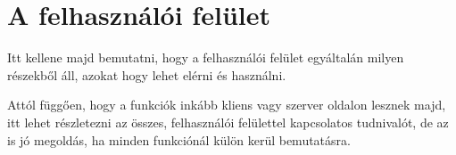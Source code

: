 \chapter{A felhasználói felület}

Itt kellene majd bemutatni, hogy a felhasználói felület egyáltalán milyen részekből áll, azokat hogy lehet elérni és használni.

Attól függően, hogy a funkciók inkább kliens vagy szerver oldalon lesznek majd, itt lehet részletezni az összes, felhasználói felülettel kapcsolatos tudnivalót, de az is jó megoldás, ha minden funkciónál külön kerül bemutatásra.
